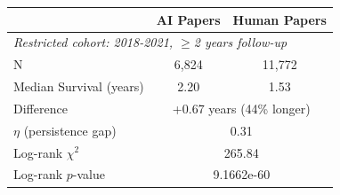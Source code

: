 \begin{tabular}{lcc}
\toprule
& \textbf{AI Papers} & \textbf{Human Papers} \\
\midrule
\multicolumn{3}{l}{\textit{Restricted cohort: 2018-2021, $\geq$2 years follow-up}} \\
\midrule
N & 6,824 & 11,772 \\
Median Survival (years) & 2.20 & 1.53 \\
Difference & \multicolumn{2}{c}{+0.67 years (44\% longer)} \\
$\eta$ (persistence gap) & \multicolumn{2}{c}{0.31} \\
\midrule
Log-rank $\chi^2$ & \multicolumn{2}{c}{265.84} \\
Log-rank $p$-value & \multicolumn{2}{c}{9.1662e-60} \\
\bottomrule
\end{tabular}